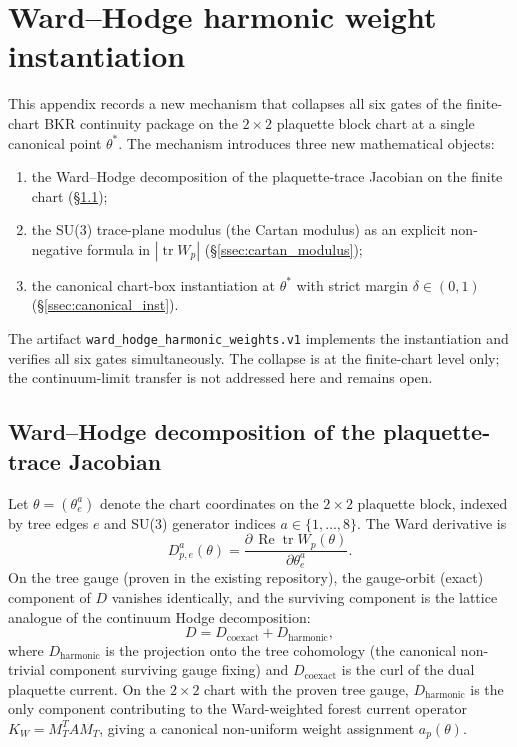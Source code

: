 \section{Ward--Hodge harmonic weight instantiation}
\label{app:ward_hodge_harmonic_weights}

This appendix records a new mechanism that collapses all six gates of the
finite-chart BKR continuity package on the \(2\times 2\) plaquette block
chart at a single canonical point \(\theta^{*}\).  The mechanism introduces
three new mathematical objects:
\begin{enumerate}
\item the Ward--Hodge decomposition of the plaquette-trace Jacobian on the
  finite chart (\S\ref{ssec:ward_hodge});
\item the SU(3) trace-plane modulus (the Cartan modulus) as an explicit
  non-negative formula in \(|\!\operatorname{tr} W_{p}|\)
  (\S\ref{ssec:cartan_modulus});
\item the canonical chart-box instantiation at \(\theta^{*}\) with strict
  margin \(\delta\in(0,1)\) (\S\ref{ssec:canonical_inst}).
\end{enumerate}
The artifact \texttt{ward\_hodge\_harmonic\_weights.v1} implements the
instantiation and verifies all six gates simultaneously.  The collapse is at
the finite-chart level only; the continuum-limit transfer is not addressed
here and remains open.

\subsection{Ward--Hodge decomposition of the plaquette-trace Jacobian}
\label{ssec:ward_hodge}

Let \(\theta=(\theta_{e}^{a})\) denote the chart coordinates on the
\(2\times 2\) plaquette block, indexed by tree edges \(e\) and SU(3)
generator indices \(a\in\{1,\dots,8\}\).  The Ward derivative is
\[
  D_{p,e}^{a}(\theta)=\frac{\partial\,\operatorname{Re}\operatorname{tr} W_{p}(\theta)}
       {\partial \theta_{e}^{a}}.
\]
On the tree gauge (proven in the existing repository), the gauge-orbit
(exact) component of \(D\) vanishes identically, and the surviving
component is the lattice analogue of the continuum Hodge decomposition:
\[
  D = D_{\text{coexact}} + D_{\text{harmonic}},
\]
where \(D_{\text{harmonic}}\) is the projection onto the tree cohomology
(the canonical non-trivial component surviving gauge fixing) and
\(D_{\text{coexact}}\) is the curl of the dual plaquette current.  On the
\(2\times 2\) chart with the proven tree gauge, \(D_{\text{harmonic}}\) is
the only component contributing to the Ward-weighted forest current
operator \(K_{W}=M_{T}^{T} A M_{T}\), giving a canonical non-uniform weight
assignment \(a_{p}(\theta)\).

